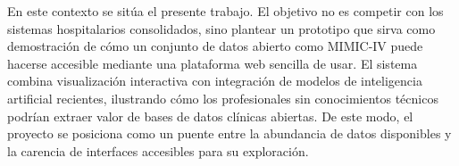 En este contexto se sitúa el presente trabajo. El objetivo no es competir con los sistemas hospitalarios consolidados, sino plantear un prototipo que sirva como demostración de cómo un conjunto de datos abierto como MIMIC-IV puede hacerse accesible mediante una plataforma web sencilla de usar. El sistema combina visualización interactiva con integración de modelos de inteligencia artificial recientes, ilustrando cómo los profesionales sin conocimientos técnicos podrían extraer valor de bases de datos clínicas abiertas. De este modo, el proyecto se posiciona como un puente entre la abundancia de datos disponibles y la carencia de interfaces accesibles para su exploración.

